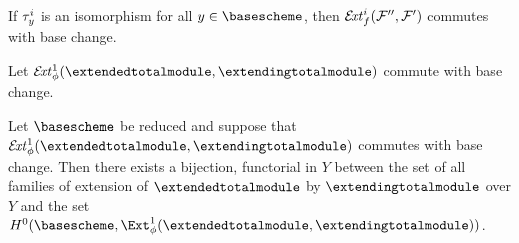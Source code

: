 \begin{remark}
	If $\tau^i_{y}$ is an isomorphism for all $\basepoint\in\basescheme$, then $\mathcal{E}\!\mathit{xt}_{f}^i(\mathcal{F}'',\mathcal{F}')$ commutes with base change.
\end{remark}

\begin{remark}
	Let $\EXT^1_\totalmap(\extendedtotalmodule,\extendingtotalmodule)$ commute with base change. 
\end{remark}

\begin{proposition}
	 Let $\basescheme$ be reduced and suppose that $\EXT^1_\totalmap(\extendedtotalmodule,\extendingtotalmodule)$ commutes with base change. Then there exists a bijection, functorial in $Y$ between the set of all families of extension of $\extendedtotalmodule$ by $\extendingtotalmodule$ over $Y$ and the set
	 $H^0(\basescheme, \Ext^1_\totalmap(\extendedtotalmodule, \extendingtotalmodule))$.
\end{proposition}